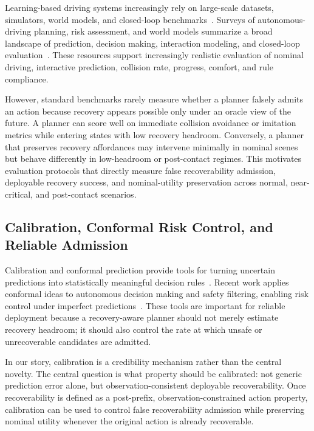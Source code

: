 \documentclass[conference]{IEEEtran}
\begin{document}
Learning-based driving systems increasingly rely on large-scale datasets, simulators, world models, and closed-loop benchmarks~\cite{dosovitskiy2017carla,caesar2021nuplan,li2022metadrive,ettinger2021large,wilson2023argoverse,zhan2019interaction,althoff2017commonroad,krajewski2018highd,caesar2020nuscenes}.  Surveys of autonomous-driving planning, risk assessment, and world models summarize a broad landscape of prediction, decision making, interaction modeling, and closed-loop evaluation~\cite{ding2025understanding,lu2025risk,hu2025survey}.  These resources support increasingly realistic evaluation of nominal driving, interactive prediction, collision rate, progress, comfort, and rule compliance.

However, standard benchmarks rarely measure whether a planner falsely admits an action because recovery appears possible only under an oracle view of the future.  A planner can score well on immediate collision avoidance or imitation metrics while entering states with low recovery headroom.  Conversely, a planner that preserves recovery affordances may intervene minimally in nominal scenes but behave differently in low-headroom or post-contact regimes.  This motivates evaluation protocols that directly measure false recoverability admission, deployable recovery success, and nominal-utility preservation across normal, near-critical, and post-contact scenarios.

\subsection{Calibration, Conformal Risk Control, and Reliable Admission}

Calibration and conformal prediction provide tools for turning uncertain predictions into statistically meaningful decision rules~\cite{vovk2005algorithmic,stephen2021gentle,angelopoulos2024conformal}.  Recent work applies conformal ideas to autonomous decision making and safety filtering, enabling risk control under imperfect predictions~\cite{lekeufack2024conformal,strawn2023conformal}.  These tools are important for reliable deployment because a recovery-aware planner should not merely estimate recovery headroom; it should also control the rate at which unsafe or unrecoverable candidates are admitted.

In our story, calibration is a credibility mechanism rather than the central novelty.  The central question is what property should be calibrated: not generic prediction error alone, but observation-consistent deployable recoverability.  Once recoverability is defined as a post-prefix, observation-constrained action property, calibration can be used to control false recoverability admission while preserving nominal utility whenever the original action is already recoverable.
\end{document}
